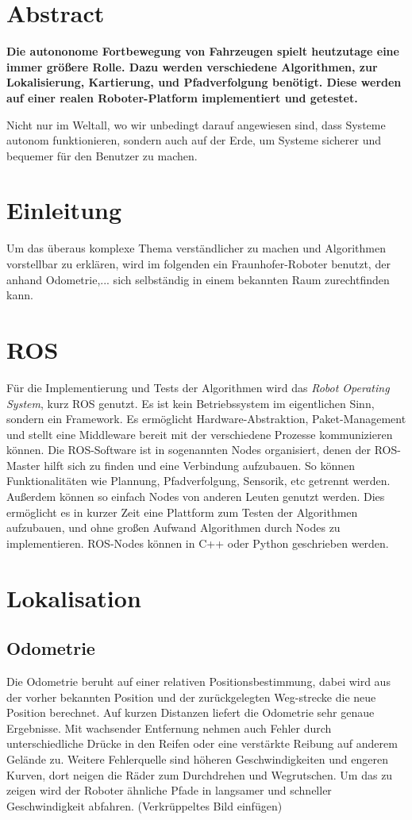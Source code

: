 \documentclass[11pt,a4paper]{article}
\begin{document}
\section*{Abstract}
{
\textbf{Die autononome Fortbewegung von Fahrzeugen spielt heutzutage eine immer gr\"o\ss{}ere Rolle. Dazu werden verschiedene Algorithmen, zur Lokalisierung, Kartierung, und Pfadverfolgung ben\"otigt. Diese werden auf einer realen Roboter-Platform implementiert und getestet.}

Nicht nur im Weltall, wo wir unbedingt darauf angewiesen sind, dass Systeme autonom funktionieren, sondern auch auf der Erde, um Systeme sicherer und bequemer f\"ur den Benutzer zu machen. 


\section{Einleitung}
Um das überaus komplexe Thema verst\"andlicher zu machen und Algorithmen vorstellbar zu erkl\"aren, wird im folgenden ein Fraunhofer-Roboter benutzt, der anhand Odometrie,... sich selbst\"andig in einem bekannten Raum zurechtfinden kann.

\section{ROS}
F\"ur die Implementierung und Tests der Algorithmen wird das \textit{Robot Operating System}, kurz ROS genutzt. Es ist kein Betriebssystem im eigentlichen Sinn, sondern ein Framework. Es erm\"oglicht Hardware-Abstraktion, Paket-Management und stellt eine Middleware bereit mit der verschiedene Prozesse kommunizieren k\"onnen. \cite{rosWiki}
Die ROS-Software ist in sogenannten Nodes organisiert, denen der ROS-Master hilft sich zu finden und eine Verbindung aufzubauen. So k\"onnen Funktionalit\"aten wie Plannung, Pfadverfolgung, Sensorik, etc getrennt werden. Au{\ss}erdem k\"onnen so einfach Nodes von anderen Leuten genutzt werden. Dies erm\"oglicht es in kurzer Zeit eine Plattform zum Testen der Algorithmen aufzubauen, und ohne gro{\ss}en Aufwand Algorithmen durch Nodes zu implementieren. ROS-Nodes k\"onnen in C++ oder Python geschrieben werden. 
 

\section{Lokalisation}
\subsection{Odometrie}
{Die Odometrie beruht auf einer relativen Positionsbestimmung, dabei wird aus der vorher bekannten Position und der zur\"uckgelegten Weg-strecke die neue Position berechnet. Auf kurzen Distanzen liefert die Odometrie sehr genaue Ergebnisse. Mit wachsender Entfernung nehmen auch Fehler durch unterschiedliche Dr\"ucke in den Reifen oder eine verst\"arkte Reibung auf anderem Gel\"ande zu. Weitere Fehlerquelle sind h\"oheren Geschwindigkeiten und engeren Kurven, dort neigen die R\"ader zum Durchdrehen und Wegrutschen. Um das zu zeigen wird der Roboter \"ahnliche Pfade in langsamer und schneller Geschwindigkeit abfahren. 
	(Verkrüppeltes Bild einfügen)
	
}}
\end{document}
